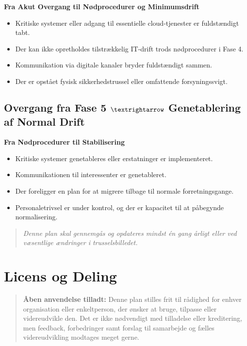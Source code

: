 \documentclass[a4paper,11pt,oneside]{book}
\def\tightlist{}
\begin{document}
\textbf{Fra Akut Overgang til Nødprocedurer og Minimumsdrift}

\begin{itemize}
\tightlist
\item
  Kritiske systemer eller adgang til essentielle cloud-tjenester er
  fuldstændigt tabt.
\item
  Der kan ikke opretholdes tilstrækkelig IT-drift trods nødprocedurer i
  Fase 4.
\item
  Kommunikation via digitale kanaler bryder fuldstændigt sammen.
\item
  Der er opstået fysisk sikkerhedstrussel eller omfattende
  forsyningssvigt.
\end{itemize}

\section{\texorpdfstring{Overgang fra Fase 5 \(\textrightarrow\)
Genetablering af Normal
Drift}{Overgang fra Fase 5 \textbackslash textrightarrow Genetablering af Normal Drift}}\label{overgang-fra-fase-5-textrightarrow-genetablering-af-normal-drift}

\textbf{Fra Nødprocedurer til Stabilisering}

\begin{itemize}
\tightlist
\item
  Kritiske systemer genetableres eller erstatninger er implementeret.
\item
  Kommunikationen til interessenter er genetableret.
\item
  Der foreligger en plan for at migrere tilbage til normale
  forretningsgange.
\item
  Personaletrivsel er under kontrol, og der er kapacitet til at
  påbegynde normalisering.
\end{itemize}

\begin{quote}
\emph{Denne plan skal gennemgås og opdateres mindst én gang årligt eller
ved væsentlige ændringer i trusselsbilledet.}
\end{quote}

\newpage

\chapter{Licens og Deling}\label{licens-og-deling}

\begin{quote}
\textbf{Åben anvendelse tilladt:} Denne plan stilles frit til rådighed
for enhver organisation eller enkeltperson, der ønsker at bruge,
tilpasse eller videreudvikle den. Det er ikke nødvendigt med tilladelse
eller kreditering, men feedback, forbedringer samt forslag til
samarbejde og fælles videreudvikling modtages meget gerne.
\end{quote}
\end{document}
